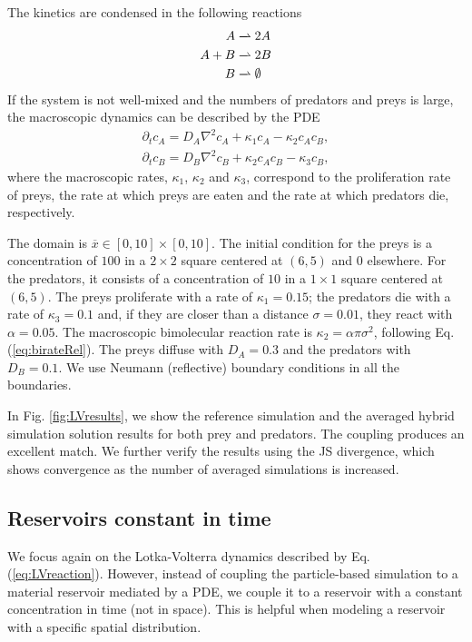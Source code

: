 \documentclass[10pt,twocolumn]{revtex4-1}
\begin{document}
	The kinetics are condensed in the following reactions
	\begin{align}
	A&\xrightharpoonup[]{}2A  \nonumber\\
	A+B&\xrightharpoonup[]{}2B 	\label{eq:LVreaction} \\ 
	B&\xrightharpoonup[]{}\emptyset \nonumber
	\end{align} %
	If the system is not well-mixed and the numbers of predators and preys is large, the macroscopic dynamics can be described by the PDE
	\begin{align}
	\partial_t c_A=D_{A} \nabla^2 c_A + \kappa_1c_A - \kappa_2c_Ac_B, \nonumber \\
	\partial_t c_B=D_{B} \nabla^2 c_B + \kappa_2c_Ac_B - \kappa_3 c_B, 
	\label{LotkaVolterraPDE}
	\end{align}
	where the macroscopic rates, $\kappa_1$, $\kappa_2$ and $\kappa_3$, correspond to the proliferation rate of preys, the rate at which preys are eaten and the rate at which predators die, respectively.  
	
	The domain is $\overline{x}\in[0,10]\times[0,10]$. The initial condition for the preys is a concentration of $100$ in a $2\times 2$ square centered at $(6,5)$ and $0$ elsewhere. For the predators, it consists of a concentration of $10$ in a $1\times 1$ square centered at $(6,5)$. The preys proliferate with a rate of $\kappa_1=0.15$; the predators die with a rate of $\kappa_3=0.1$ and, if they are closer than a distance $\sigma=0.01$, they react with $\alpha=0.05$. The macroscopic bimolecular reaction rate is $\kappa_2=\alpha \pi \sigma^2$, following Eq. (\ref{eq:birateRel}). The preys diffuse with $D_A=0.3$ and the predators with $D_B=0.1$. We use Neumann (reflective) boundary conditions in all the boundaries. 
	
	In Fig. \ref{fig:LVresults}, we show the reference simulation and the averaged hybrid simulation solution results for both prey and predators. The coupling produces an excellent match. We further verify the results using the JS divergence, which shows convergence as the number of averaged simulations is increased.
	
	\subsection{Reservoirs constant in time}
	We focus again on the Lotka-Volterra dynamics described by Eq. (\ref{eq:LVreaction}). However, instead of coupling the particle-based simulation to a material reservoir mediated by a PDE, we couple it to a reservoir with a constant concentration in time (not in space). This is helpful when modeling a reservoir with a specific spatial distribution. 
	
\end{document}
